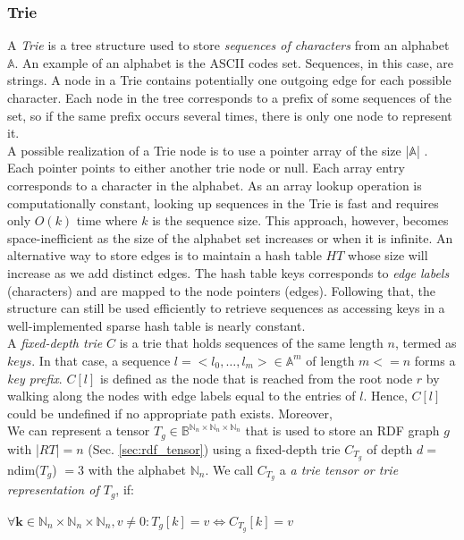 \subsubsection{Trie}
\label{sec:trie}
A \textit{Trie} \cite{Brass:2008:ADS:1434862} is a tree structure used to store \textit{sequences of characters} from an alphabet $\mathbb{A}$. An example of an alphabet is the ASCII codes set. Sequences, in this case, are strings. A node in a Trie contains potentially one outgoing edge for each possible character. Each node in the tree corresponds to a prefix of some sequences of the set, so if the same prefix occurs several times, there is only one node to represent it.\\

A possible realization of a Trie node is to use a pointer array of the size |$\mathbb{A}$| \cite{Brass:2008:ADS:1434862}. Each pointer points to either another trie node or null. Each array entry corresponds to a character in the alphabet. As an array lookup operation is computationally constant, looking up sequences in the Trie is fast and requires only $O(k)$ time where $k$ is the sequence size. This approach, however, becomes space-inefficient as the size of the alphabet set increases or when it is infinite. An alternative way to store edges is to maintain a hash table $HT$ whose size will increase as we add distinct edges. The hash table keys corresponds to \textit{edge labels} (characters) and are mapped to the node pointers (edges). Following that, the structure can still be used efficiently to retrieve sequences as accessing keys in a well-implemented sparse hash table is nearly constant. \\ 

A \textit{fixed-depth trie} $C$ is a trie that holds sequences of the same length $n$, termed as $keys$. In that case, a sequence $l = <l_0, … , l_m> \in \mathbb{A}^m$ of length $m <= n$ forms a \textit{key prefix}. $C[l]$ is defined as the node that is reached from the root node $r$ by walking along the nodes with edge labels equal to the entries of $l$. Hence, $C[l]$ could be undefined if no appropriate path exists. Moreover, \\

We can represent a tensor $T_g \in \mathbb{B}^{\mathbb{N}_n \times \mathbb{N}_n \times \mathbb{N}_n}$ that is used to store an RDF graph $g$ with |$RT$|$=n$ (Sec. \ref{sec:rdf_tensor}) using a fixed-depth trie $C_{T_g}$ of depth $d = $ ndim($T_g$) $=3$ with the alphabet $\mathbb{N}_n$. We call $C_{T_g}$ a \textit{a trie tensor or trie representation of $T_g$}, if: \\
\centerline{$\forall \textbf{k} \in \mathbb{N}_n \times \mathbb{N}_n \times \mathbb{N}_n, v \neq 0: T_g[k] = v \iff C_{T_g}[k] = v$}\\

